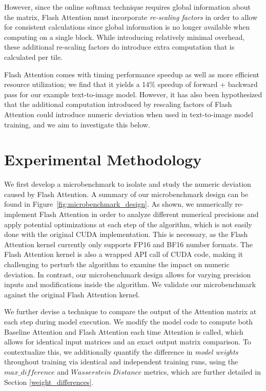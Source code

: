 However, since the online softmax technique requires global information about the matrix, Flash Attention must incorporate \textit{re-scaling factors} in order to allow for consistent calculations since global information is no longer available when computing on a single block. While introducing relatively minimal overhead, these additional re-scaling factors do introduce extra computation that is calculated per tile.

Flash Attention comes with timing performance speedup as well as more efficient resource utilization; we find that it yields a 14\% speedup of forward + backward pass for our example text-to-image model. However, it has also been hypothesized that the additional computation introduced by rescaling factors of Flash Attention could introduce numeric deviation when used in text-to-image model training, and we aim to investigate this below.

\section{Experimental Methodology}

We first develop a microbenchmark to isolate and study the numeric deviation caused by Flash Attention. A summary of our microbenchmark design can be found in Figure~\ref{fig:microbenchmark_design}. As shown, we numerically re-implement Flash Attention in order to analyze different numerical precisions and apply potential optimizations at each step of the algorithm, which is not easily done with the original CUDA implementation. This is necessary, as the Flash Attention kernel currently only supports FP16 and BF16 number formats. The Flash Attention kernel is also a wrapped API call of CUDA code, making it challenging to perturb the algorithm to examine the impact on numeric deviation. In contrast, our microbenchmark design allows for varying precision inputs and modifications inside the algorithm. We validate our microbenchmark against the original Flash Attention kernel.

We further devise a technique to compare the output of the Attention matrix at each step during model execution. We modify the model code to compute both Baseline Attention and Flash Attention each time Attention is called, which allows for identical input matrices and an exact output matrix comparison. To contextualize this, we additionally quantify the difference in \textit{model weights} throughout training via identical and independent training runs, using the $max\_difference$ and $Wasserstein\ Distance$ metrics, which are further detailed in Section \ref{weight_differences}. 

